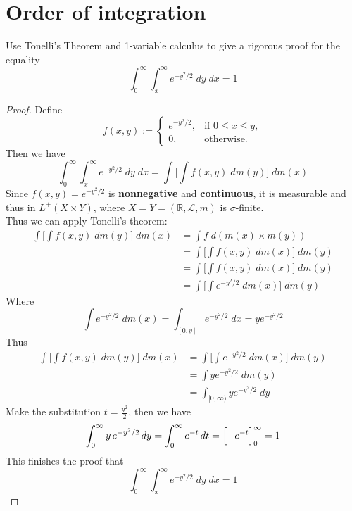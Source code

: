 \documentclass[lang=cn,11pt]{elegantbook}
\begin{document}
\section{Order of integration}
  Use Tonelli's Theorem and 1-variable calculus to give a rigorous proof for the equality
  \[
    \int_0^\infty\int_x^\infty e^{-y^2/2}\;d y \;d x=1
  \]
\begin{proof}
 Define \[
 f(x,y) := \begin{cases}
   e^{-y^2/2}, & \text{if } 0 \le x \le y,\\
   0, & \text{otherwise}.
   \end{cases}
 \] Then we have \[
     \int_0^\infty\int_x^\infty e^{-y^2/2}\;d y \;d x=   \int \Big[   \int f(x,y) \; d m(y)  \Big]  \; dm(x) 
 \]
 Since $ f (x,y) = e^{-y^2/2}$ is \textbf{nonnegative} and \textbf{continuous}, it is measurable and thus in $L^+(X \times Y)$, where $X = Y = (\mathbb{R},\mathcal{L}, m)$ is $\sigma$-finite.\\
    Thus we can apply Tonelli's theorem: \begin{align}
      \int \Big[   \int f(x,y) \; d m(y)  \Big]  \; dm(x) &= \int f \; d(m(x)  \times m(y))     \\
& =    \int \Big[   \int f(x,y) \; d m(x)  \Big]  \; dm(y) \\
& =  \int \Big[   \int f(x,y) \; d m(x)  \Big]  \; dm(y) \\
& = \int \Big[   \int e^{-y^2/2} \; d m(x)  \Big]  \; dm(y) 
    \end{align}Where\[
     \int e^{-y^2/2} \; d m(x)   = \int_{[0,y]} e^{-y^2/2} \; dx =  ye^{-y^2/2}
    \]
Thus  \begin{align}
      \int \Big[   \int f(x,y) \; d m(y)  \Big]  \; dm(x) &=\int \Big[   \int e^{-y^2/2} \; d m(x)  \Big]  \; dm(y) \\
      &= \int ye^{-y^2/2} \; dm(y) \\
      & = \int_{[0,\infty)} ye^{-y^2/2} \; dy 
\end{align}
Make the substitution \(t = \frac{y^2}{2}\), then we have
\[
\int_0^\infty y\, e^{-y^2/2}\,dy =
\int_0^\infty e^{-t}\,dt =
\Bigl[ - e^{-t} \Bigr]_{0}^{\infty} = 1
\]
This finishes the proof that \[
 \int_0^\infty\int_x^\infty e^{-y^2/2}\;d y \;d x = 1
\]
\end{proof}
\end{document}
